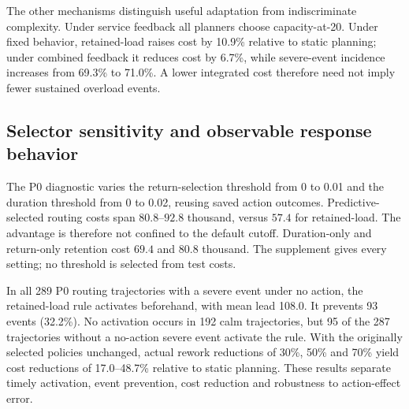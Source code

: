 The other mechanisms distinguish useful adaptation from indiscriminate complexity. Under service feedback all planners choose capacity-at-20. Under fixed behavior, retained-load raises cost by 10.9\% relative to static planning; under combined feedback it reduces cost by 6.7\%, while severe-event incidence increases from 69.3\% to 71.0\%. A lower integrated cost therefore need not imply fewer sustained overload events.

\subsection{Selector sensitivity and observable response behavior}
The P0 diagnostic varies the return-selection threshold from 0 to 0.01 and the duration threshold from 0 to 0.02, reusing saved action outcomes. Predictive-selected routing costs span $80.8$--$92.8$ thousand, versus $57.4$ for retained-load. The advantage is therefore not confined to the default cutoff. Duration-only and return-only retention cost $69.4$ and $80.8$ thousand. The supplement gives every setting; no threshold is selected from test costs.

In all 289 P0 routing trajectories with a severe event under no action, the retained-load rule activates beforehand, with mean lead 108.0. It prevents 93 events (32.2\%). No activation occurs in 192 calm trajectories, but 95 of the 287 trajectories without a no-action severe event activate the rule. With the originally selected policies unchanged, actual rework reductions of 30\%, 50\% and 70\% yield cost reductions of 17.0--48.7\% relative to static planning. These results separate timely activation, event prevention, cost reduction and robustness to action-effect error.


